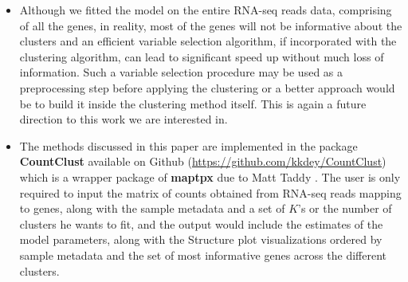\begin{itemize}
\item Although we fitted the model on the entire RNA-seq reads data, comprising of all the genes, in reality, most of the genes will not be informative about the clusters and an efficient variable selection algorithm, if incorporated with the clustering algorithm, can lead to significant speed up without much loss of information. Such a variable selection procedure may be used as a preprocessing step before applying the clustering or a better approach would be to build it inside the clustering method itself. This is again a future direction to this work we are interested in.

\item The methods discussed in this paper are implemented in the package  \textbf{CountClust} available on Github (\href{https://github.com/kkdey/CountClust}{https://github.com/kkdey/CountClust}) which is a wrapper package of \textbf{maptpx} due to Matt Taddy \cite{Taddy2012}. The user is only required to input the matrix of counts obtained from RNA-seq  reads mapping to genes, along with the sample metadata and a set of $K$'s or the number of clusters he wants to fit, and the output would include the estimates of the model parameters, along with the Structure plot visualizations ordered by sample metadata and the set of most informative genes across the different clusters. 




\end{itemize}

